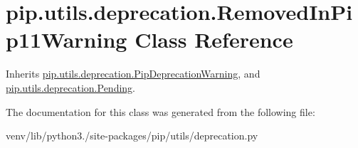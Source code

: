 \hypertarget{classpip_1_1utils_1_1deprecation_1_1_removed_in_pip11_warning}{}\section{pip.\+utils.\+deprecation.\+Removed\+In\+Pip11\+Warning Class Reference}
\label{classpip_1_1utils_1_1deprecation_1_1_removed_in_pip11_warning}


Inherits \hyperlink{classpip_1_1utils_1_1deprecation_1_1_pip_deprecation_warning}{pip.\+utils.\+deprecation.\+Pip\+Deprecation\+Warning}, and \hyperlink{classpip_1_1utils_1_1deprecation_1_1_pending}{pip.\+utils.\+deprecation.\+Pending}.



The documentation for this class was generated from the following file\+:\begin{DoxyCompactItemize}
\item 
venv/lib/python3./site-\/packages/pip/utils/deprecation.\+py\end{DoxyCompactItemize}

